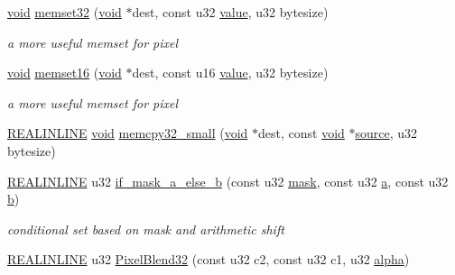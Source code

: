 \begin{DoxyCompactItemize}
\item 
\hyperlink{wglext_8h_a9e6b7f1933461ef318bb000d6bd13b83}{void} \hyperlink{namespaceirr_ad2ddd8ca49676249e463c61701dffc13}{memset32} (\hyperlink{wglext_8h_a9e6b7f1933461ef318bb000d6bd13b83}{void} $\ast$dest, const u32 \hyperlink{glext_8h_a79169be77d7e02a24f68a5bfe627dc29}{value}, u32 bytesize)
\begin{DoxyCompactList}\small\item\em a more useful memset for pixel \end{DoxyCompactList}\item 
\hyperlink{wglext_8h_a9e6b7f1933461ef318bb000d6bd13b83}{void} \hyperlink{namespaceirr_ab6b322d02a81e6e47d72ed26392baa43}{memset16} (\hyperlink{wglext_8h_a9e6b7f1933461ef318bb000d6bd13b83}{void} $\ast$dest, const u16 \hyperlink{glext_8h_a79169be77d7e02a24f68a5bfe627dc29}{value}, u32 bytesize)
\begin{DoxyCompactList}\small\item\em a more useful memset for pixel \end{DoxyCompactList}\item 
\hyperlink{_software_driver2__compile__config_8h_a3695e51e0a187a6c49684ba3206b0d0a}{R\-E\-A\-L\-I\-N\-L\-I\-N\-E} \hyperlink{wglext_8h_a9e6b7f1933461ef318bb000d6bd13b83}{void} \hyperlink{namespaceirr_a7d85ef9b5ef5429e75a2bbce691a5c0c}{memcpy32\-\_\-small} (\hyperlink{wglext_8h_a9e6b7f1933461ef318bb000d6bd13b83}{void} $\ast$dest, const \hyperlink{wglext_8h_a9e6b7f1933461ef318bb000d6bd13b83}{void} $\ast$\hyperlink{glext_8h_afdd0f0e67e302eefcb4f6b23732e7ea3}{source}, u32 bytesize)
\item 
\hyperlink{_software_driver2__compile__config_8h_a3695e51e0a187a6c49684ba3206b0d0a}{R\-E\-A\-L\-I\-N\-L\-I\-N\-E} u32 \hyperlink{namespaceirr_aacb0bcbb0a7a0464bdf8983e2850a013}{if\-\_\-mask\-\_\-a\-\_\-else\-\_\-b} (const u32 \hyperlink{glext_8h_abb269dedb7ad104274cc9f5c0c7285bc}{mask}, const u32 \hyperlink{glext_8h_ac8729153468b5dcf13f971b21d84d4e5}{a}, const u32 \hyperlink{glext_8h_a6eba317e3cf44d6d26c04a5a8f197dcb}{b})
\begin{DoxyCompactList}\small\item\em conditional set based on mask and arithmetic shift \end{DoxyCompactList}\item 
\hyperlink{_software_driver2__compile__config_8h_a3695e51e0a187a6c49684ba3206b0d0a}{R\-E\-A\-L\-I\-N\-L\-I\-N\-E} u32 \hyperlink{namespaceirr_a03ddb0cb06633940be2b9f48c936205b}{Pixel\-Blend32} (const u32 c2, const u32 c1, u32 \hyperlink{glext_8h_a55d98ec4b6aa35ace9b91275e7ad847b}{alpha})

\end{DoxyCompactItemize}
